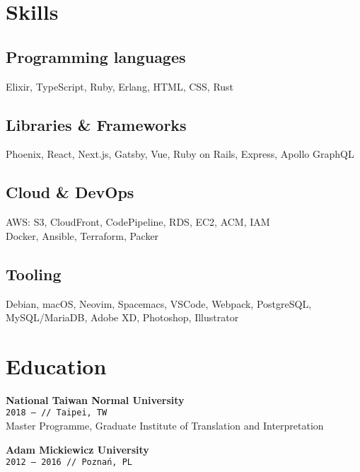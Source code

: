 \documentclass[10pt,a4paper]{article}
\newcommand{\project}[3]{\par\vspace{1em}\textbf{\normalsize #1}\\{\footnotesize\texttt{#2 // #3}}\\[4pt]}
\begin{document}
\begin{minipage}[t]{0.3\textwidth}
  \raggedright
  \section{Skills}

  \subsection{Programming languages}

  \small
  Elixir, TypeScript, Ruby, Erlang, HTML, CSS, Rust
  \vspace{4pt}

  \subsection{Libraries \& Frameworks}

  \small
  Phoenix, React, Next.js, Gatsby, Vue, Ruby on Rails, Express, Apollo GraphQL
  \vspace{4pt}

  \subsection{Cloud \& DevOps}

  \small
  AWS: S3, CloudFront, CodePipeline, RDS, EC2, ACM, IAM\\ Docker, Ansible, Terraform, Packer
  \vspace{4pt}

  \subsection{Tooling}

  \small
  Debian, macOS, Neovim, Spacemacs, VSCode, Webpack, PostgreSQL, MySQL/MariaDB, Adobe XD, Photoshop, Illustrator
  \vspace{12pt}

  \section{Education}
  \vspace{-6pt}

  \project{National Taiwan Normal University}{2018 {–}}{Taipei, TW}

  \small Master Programme, Graduate Institute of Translation and Interpretation

  \project{Adam Mickiewicz University}{2012 {–} 2016}{Poznań, PL}


\end{minipage}
\end{document}
